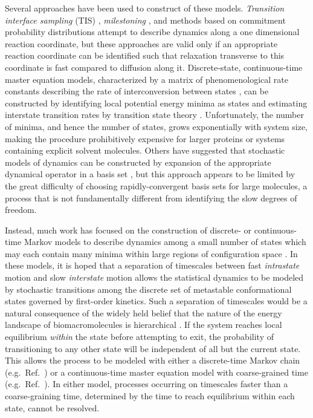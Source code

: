 Several approaches have been used to construct of these models.
\emph{Transition interface sampling} (TIS) \cite{moroni:2004b}, \emph{milestoning} \cite{faradjian:2004a}, and methods based on commitment probability distributions \cite{rhee:2005a,berezhkovskii:2005a} attempt to describe dynamics along a one dimensional reaction coordinate, but these approaches are valid only if an appropriate reaction coordinate can be identified such that relaxation transverse to this coordinate is fast compared to diffusion along it.
Discrete-state, continuous-time master equation models, characterized by a matrix of phenomenological rate constants describing the rate of interconversion between states \cite{vankampen}, can be constructed by identifying local potential energy minima as states and estimating interstate transition rates by transition state theory \cite{czerminski:1990a,kunz:1995a,ball:1998b,levy:2001a,mortenson:2001a,mortenson:2002a,evans:2004a}.
Unfortunately, the number of minima, and hence the number of states, grows exponentially with system size, making the procedure prohibitively expensive for larger proteins or systems containing explicit solvent molecules.
Others have suggested that stochastic models of dynamics can be constructed by expansion of the appropriate dynamical operator in a basis set \cite{shalloway:1996a,ulitsky:1998a,shen:2003a}, but this approach appears to be limited by the great difficulty of choosing rapidly-convergent basis sets for large molecules, a process that is not fundamentally different from identifying the slow degrees of freedom.

Instead, much work has focused on the construction of discrete- or continuous-time Markov models to describe dynamics among a small number of states which may each contain many minima within large regions of configuration space \cite{grubmueller:1994a,degroot:2001a,swope:2004b,singhal:2004a,levy:2005a,sorin:2005b,sriraman:2005a,schultheis:2005a,singhal:2005a,elmer:2005b,park:2006a}.
In these models, it is hoped that a separation of timescales between fast \emph{intrastate} motion and slow \emph{interstate} motion allows the statistical dynamics to be modeled by stochastic transitions among the discrete set of metastable conformational states governed by first-order kinetics.
Such a separation of timescales would be a natural consequence of the widely held belief that the nature of the energy landscape of biomacromolecules is hierarchical \cite{ansari:1985a,bai:1989a,becker:1997a,levy:2001a,levy:2002a}.
If the system reaches local equilibrium \emph{within} the state before attempting to exit, the probability of transitioning to any other state will be independent of all but the current state.
This allows the process to be modeled with either a discrete-time Markov chain (e.g.\ Ref.\ \cite{singhal:2004a}) or a continuous-time master equation model with coarse-grained time (e.g.\ Ref.\ \cite{sriraman:2005a}).
In either model, processes occurring on timescales faster than a coarse-graining time, determined by the time to reach equilibrium within each state, cannot be resolved.

